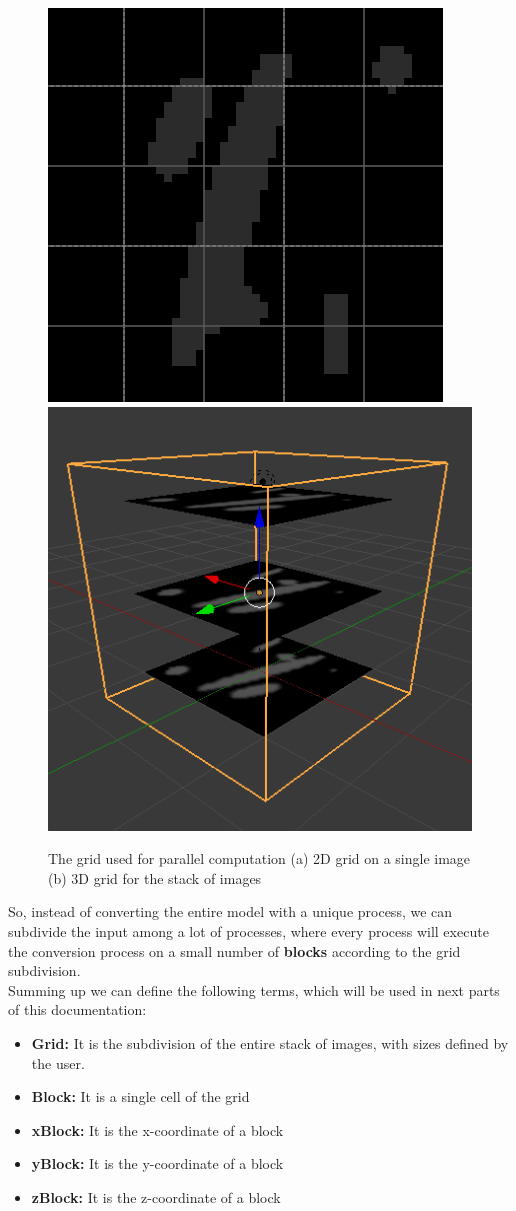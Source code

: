 \documentclass[11pt,oneside]{article}	%
\begin{document}
\begin{figure}[htb] %
   \centering
   \includegraphics[width=0.45\linewidth]{images/imageGrid.png} \hfill
   \includegraphics[width=0.45\linewidth]{images/imageGrid3d.png}
   \caption{The grid used for parallel computation (a) 2D grid on a single image (b) 3D grid for the stack of images}
   \label{fig:grid}
\end{figure}

So, instead of converting the entire model with a unique process, we can subdivide the input among a lot of processes, where every process will execute the conversion process on a small number of \textbf{blocks} according to the grid subdivision.\\

Summing up we can define the following terms, which will be used in next parts of this documentation:

\begin{itemize}
 \item \textbf{Grid:} It is the subdivision of the entire stack of images, with sizes defined by the user.
 \item \textbf{Block:} It is a single cell of the grid
 \item \textbf{xBlock:} It is the x-coordinate of a block
 \item \textbf{yBlock:} It is the y-coordinate of a block
 \item \textbf{zBlock:} It is the z-coordinate of a block
\end{itemize}
\end{document}

